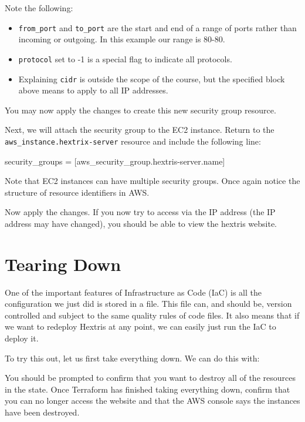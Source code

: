 \documentclass{csse4400}
\begin{document}
Note the following:
\begin{itemize}
  \item \texttt{from\_port} and \texttt{to\_port} are the start and end of a range of ports rather than incoming or outgoing. In this example our range is 80-80.
  \item \texttt{protocol} set to -1 is a special flag to indicate all protocols.
  \item Explaining \texttt{cidr} is outside the scope of the course, but the specified block above means to apply to all IP addresses.
\end{itemize}

You may now apply the changes to create this new security group resource.

Next, we will attach the security group to the EC2 instance.
Return to the \texttt{aws\_instance.hextrix-server} resource
and include the following line:

\begin{code}[language=terraform,numbers=none]{}
security_groups = [aws_security_group.hextris-server.name]
\end{code}

Note that EC2 instances can have multiple security groups.
Once again notice the structure of resource identifiers in AWS.


Now apply the changes.
If you now try to access via the IP address
(the IP address may have changed),
you should be able to view the hextris website.

\section{Tearing Down}

One of the important features of Infrastructure as Code (IaC) is all the configuration we just did is stored in a file.
This file can, and should be, version controlled and subject to the same quality rules of code files.
It also means that if we want to redeploy Hextris at any point,
we can easily just run the IaC to deploy it.

To try this out, let us first take everything down.
We can do this with:

You should be prompted to confirm that you want to destroy all of the resources in the state.
Once Terraform has finished taking everything down,
confirm that you can no longer access the website and that the AWS console says the instances have been destroyed.
\end{document}
